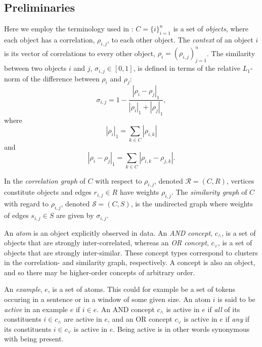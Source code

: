 \documentclass[conference]{IEEEtran}
\newcommand{\rn}[1]{\rho_{#1}}
\newcommand{\rns}[1]{|\rn{#1}|_1}
\newcommand{\acpt}{c_{\wedge}}
\newcommand{\ocpt}{c_{\vee}}
\newcommand{\sy}[1]{\sigma_{#1}}
\newcommand{\dnm}[2]{|\rn{#1}-\rn{#2}|_1}
\begin{document}
\subsection{Preliminaries}
\label{sec:preliminaries}

Here we employ the terminology used in \cite{gornerup15}: $C = \{i\}_{i=1}^n$ is a set of \emph{objects}, 
where each object has a correlation, $\rn{i,j}$, to each other object. The \emph{context} of an object $i$ is  its 
vector of correlations to every other object, $\rn{i} = (\rn{i,j})_{j=1}^n$. The similarity between two objects $i$ and 
$j$, $\sy{i,j}  \in [0, 1]$, is defined in terms of the relative $L_1$-norm of the difference between $\rn{i}$ and $\rn{j}$:
\begin{equation}\label{eq:sim}
\sy{i,j} = 1 - \frac{\dnm{i}{j}}{\rns{i} + \rns{j}},
\end{equation}
where
\begin{equation}\label{eq:totrel}
\rns{i} = \sum_{k \in C} | \rn{i,k}|
\end{equation}
and
\begin{equation}\label{}
\dnm{i}{j} =  \sum_{k \in C} | \rn{i,k} - \rn{j,k} |.
\end{equation}

In the \emph{correlation graph} of $C$ with respect to $\rn{i,j}$, denoted $\mathcal{R} = (C, R)$, 
vertices constitute objects and  edges $r_{i,j} \in R$ have weights $\rn{i,j}$. The \emph{similarity graph} of $C$ with 
regard to $\rn{i,j}$, denoted $\mathcal{S} = (C, S)$, is the undirected graph where weights of edges $s_{i,j} \in S$ are 
given by $\sy{i,j}$. 

An \emph{atom} is an object explicitly observed in data. An \emph{AND concept}, $\acpt$, is a set of objects that are strongly inter-correlated, whereas an 
\emph{OR concept}, $\ocpt$, is a set of objects that are strongly inter-similar. These concept types correspond to clusters in the 
correlation- and similarity graph, respectively. A concept is also an object, and so there may be higher-order concepts of
arbitrary order.

An \emph{example}, $e$, is a set of atoms. This could for example be a set of tokens occuring in a sentence or in a window of some given size.
An atom $i$ is said to be \emph{active} in an example $e$ if $i \in e$. An AND concept $\acpt$ is active in $e$
if \emph{all} of its constituents $i \in \acpt$ are active in $e$, and an OR concept $\ocpt$ is active in $e$ if \emph{any} if its
constituents $i \in \ocpt$ is active in $e$. Being active is in other words synonymous with being present.
\end{document}
